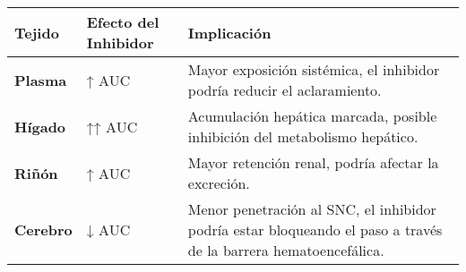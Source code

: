 \documentclass[11pt]{article}
\begin{document}
\begin{longtable}[]{@{}
  >{\raggedright\arraybackslash}p{}
  >{\raggedright\arraybackslash}p{}
  >{\raggedright\arraybackslash}p{}@{}}
\toprule\noalign{}
\begin{minipage}[b]{\linewidth}\raggedright
Tejido
\end{minipage} & \begin{minipage}[b]{\linewidth}\raggedright
Efecto del Inhibidor
\end{minipage} & \begin{minipage}[b]{\linewidth}\raggedright
Implicación
\end{minipage} \\
\midrule\noalign{}
\endhead
\bottomrule\noalign{}
\endlastfoot
\textbf{Plasma} & ↑ AUC & Mayor exposición sistémica, el inhibidor
podría reducir el aclaramiento. \\
\textbf{Hígado} & ↑↑ AUC & Acumulación hepática marcada, posible
inhibición del metabolismo hepático. \\
\textbf{Riñón} & ↑ AUC & Mayor retención renal, podría afectar la
excreción. \\
\textbf{Cerebro} & ↓ AUC & Menor penetración al SNC, el inhibidor podría
estar bloqueando el paso a través de la barrera hematoencefálica. \\
\end{longtable}


    
    
    
\end{document}
